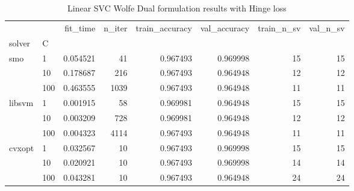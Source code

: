 \begin{table}[H]
\centering
\caption{Linear SVC Wolfe Dual formulation results with Hinge loss}
\label{linear_dual_svc_cv_results}
\begin{tabular}{llrrrrrr}
\toprule
       &     &  fit\_time &  n\_iter &  train\_accuracy &  val\_accuracy &  train\_n\_sv &  val\_n\_sv \\
solver & C &           &         &                 &               &             &           \\
\midrule
smo & 1   &  0.054521 &      41 &        0.967493 &      0.969998 &          15 &        15 \\
       & 10  &  0.178687 &     216 &        0.967493 &      0.964948 &          12 &        12 \\
       & 100 &  0.463555 &    1039 &        0.967493 &      0.964948 &          11 &        11 \\
libsvm & 1   &  0.001915 &      58 &        0.969981 &      0.964948 &          15 &        15 \\
       & 10  &  0.003209 &     728 &        0.969981 &      0.964948 &          12 &        12 \\
       & 100 &  0.004323 &    4114 &        0.967493 &      0.964948 &          11 &        11 \\
cvxopt & 1   &  0.032567 &      10 &        0.967493 &      0.969998 &          15 &        15 \\
       & 10  &  0.020921 &      10 &        0.967493 &      0.969998 &          14 &        14 \\
       & 100 &  0.043281 &      10 &        0.967493 &      0.964948 &          24 &        24 \\
\bottomrule
\end{tabular}
\end{table}

